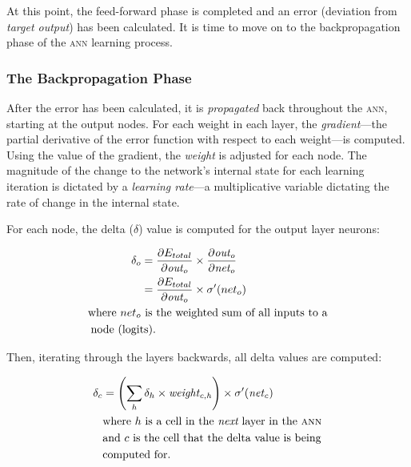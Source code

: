 \begin{multicols}{2}
\noindent At this point, the feed-forward phase is completed and an error
(deviation from \textit{target output}) has been calculated.  It is time to move
on to the backpropagation phase of the \textsc{ann} learning process.

\subsubsection{The Backpropagation Phase}

After the error has been calculated, it is \textit{propagated} back
throughout the \textsc{ann}, starting at the output nodes.  For each weight in
each layer, the \textit{gradient}---the partial derivative of the error function
with respect to each weight---is computed.  Using the value of the gradient, the
\textit{weight} is adjusted for each node.  The magnitude of the change to the
network's internal state for each learning iteration is dictated by a
\textit{learning rate}---a multiplicative variable dictating the rate of change
in the internal state.

For each node, the delta ($\delta$) value is computed for the output layer
neurons:

\begin{Figure}
  \begin{align*}
    \delta_o & =
      \frac{\partial E_{total}}{\partial \mathit{out_{o}}} \times
      \frac{\partial \mathit{out_{o}}}{\partial \mathit{net_{o}}} \\
           & =
      \frac{\partial E_{total}}{\partial \mathit{out_{o}}} \times
      \sigma'({net_{o}}) \\
    \text{where ${net_{o}}$} & \text{ is the weighted sum of all inputs to a} \\
    &\text{\hspace{-4.5em}node (logits).}
  \end{align*}
\end{Figure}

\noindent Then, iterating through the layers backwards, all delta values are
computed:

\begin{Figure}
  \begin{align*}
    \delta_{c} & = \left(\sum\limits_{h} \delta_{h} \times
             \mathit{weight_{c,h}}\right) \times \sigma'(\mathit{net_{c}}) \\
    & \text{where } h \text{ is a cell in the }\textit{next}\text{ layer in
      the }\textsc{ann} \\
    & \text{and $c$ is the cell that the delta value is being} \\
    & \text{computed for.}
  \end{align*}
\end{Figure}


\end{multicols}
